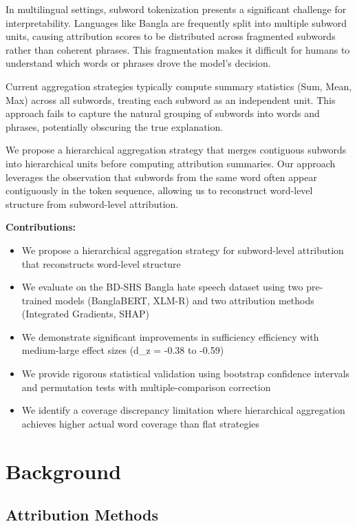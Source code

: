 \documentclass[journal]{IEEEtran}
\begin{document}
In multilingual settings, subword tokenization \cite{BPE} presents a significant challenge for interpretability. Languages like Bangla are frequently split into multiple subword units, causing attribution scores to be distributed across fragmented subwords rather than coherent phrases. This fragmentation makes it difficult for humans to understand which words or phrases drove the model's decision.

Current aggregation strategies typically compute summary statistics (Sum, Mean, Max) across all subwords, treating each subword as an independent unit. This approach fails to capture the natural grouping of subwords into words and phrases, potentially obscuring the true explanation.

We propose a hierarchical aggregation strategy that merges contiguous subwords into hierarchical units before computing attribution summaries. Our approach leverages the observation that subwords from the same word often appear contiguously in the token sequence, allowing us to reconstruct word-level structure from subword-level attribution.

\textbf{Contributions:}
\begin{itemize}
    \item We propose a hierarchical aggregation strategy for subword-level attribution that reconstructs word-level structure
    \item We evaluate on the BD-SHS Bangla hate speech dataset using two pre-trained models (BanglaBERT, XLM-R) and two attribution methods (Integrated Gradients, SHAP)
    \item We demonstrate significant improvements in sufficiency efficiency with medium-large effect sizes (d_z = -0.38 to -0.59)
    \item We provide rigorous statistical validation using bootstrap confidence intervals and permutation tests with multiple-comparison correction
    \item We identify a coverage discrepancy limitation where hierarchical aggregation achieves higher actual word coverage than flat strategies
\end{itemize}

\section{Background}

\subsection{Attribution Methods}
\end{document}
